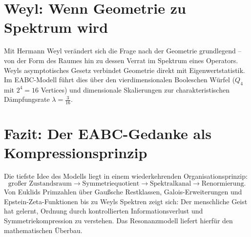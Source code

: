 \documentclass[11pt,a4paper]{scrartcl}
\begin{document}
\section{Weyl: Wenn Geometrie zu Spektrum wird}

Mit Hermann Weyl verändert sich die Frage nach der Geometrie grundlegend – von der Form des Raumes hin zu dessen Verrat im Spektrum eines Operators. Weyls asymptotisches Gesetz verbindet Geometrie direkt mit Eigenwertstatistik. Im EABC-Modell führt dies über den vierdimensionalen Booleschen Würfel ($Q_4$ mit $2^4 = 16$ Vertices) und dimensionale Skalierungen zur charakteristischen Dämpfungsrate $\lambda = \frac{3}{16}$.

\section{Fazit: Der EABC-Gedanke als Kompressionsprinzip}

Die tiefste Idee des Modells liegt in einem wiederkehrenden Organisationsprinzip:
\[
\text{großer Zustandsraum} \longrightarrow \text{Symmetriequotient} \longrightarrow \text{Spektralkanal} \longrightarrow \text{Renormierung}.
\]
Von Euklids Primzahlen über Gaußsche Restklassen, Galois-Erweiterungen und Epstein-Zeta-Funktionen bis zu Weyls Spektren zeigt sich: Der menschliche Geist hat gelernt, Ordnung durch kontrollierten Informationsverlust und Symmetriekompression zu verstehen. Das Resonanzmodell liefert hierfür den mathematischen Überbau.
\end{document}
